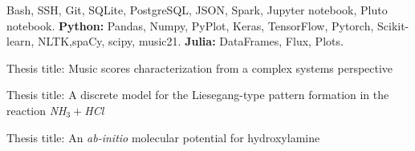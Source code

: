 \documentclass[10pt,a4paper,ragged2e,withhyper]{altacv}
\begin{document}
\begin{paracol}{2}
\divider\smallskip


Bash, SSH, Git, SQLite, PostgreSQL, JSON, Spark, Jupyter notebook, Pluto notebook. {\bf Python:} Pandas, Numpy, PyPlot, Keras, TensorFlow, Pytorch, Scikit-learn, NLTK,spaCy, scipy, music21. {\bf Julia:} DataFrames, Flux, Plots. 


\divider

\divider


\medskip


Thesis title: Music scores characterization from a complex systems perspective

\divider

Thesis title: A discrete model for the Liesegang-type pattern formation in the reaction {\em NH$_3 +$HCl}
\divider

Thesis title: An {\em ab-initio} molecular potential for hydroxylamine

\divider

\medskip
{}


\divider



\end{paracol}
\end{document}
